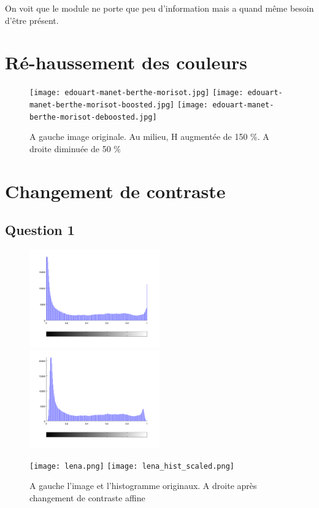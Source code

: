 \documentclass{article}
\begin{document}
On voit que le module ne porte que peu d'information mais a quand même besoin d'être présent. 


\section{Ré-haussement des couleurs}


\begin{figure}[h]

	\texttt{[image: edouart-manet-berthe-morisot.jpg]}
	\texttt{[image: edouart-manet-berthe-morisot-boosted.jpg]}
	\texttt{[image: edouart-manet-berthe-morisot-deboosted.jpg]}
  \caption{A gauche image originale. Au milieu, H augmentée de 150 \%. A droite diminuée de 50 \%}
\end{figure}



\section{Changement de contraste}

\subsection*{Question 1}

\begin{figure}[h]

	\includegraphics[width=0.5\textwidth]{hist_orig.png}
	\includegraphics[width=0.5\textwidth]{hist_scaled.png}
		
	\texttt{[image: lena.png]}
	\texttt{[image: lena\_hist\_scaled.png]}
		
	\caption{A gauche l'image et l'histogramme originaux. A droite après changement de contraste affine}
	
\end{figure}
\end{document}
